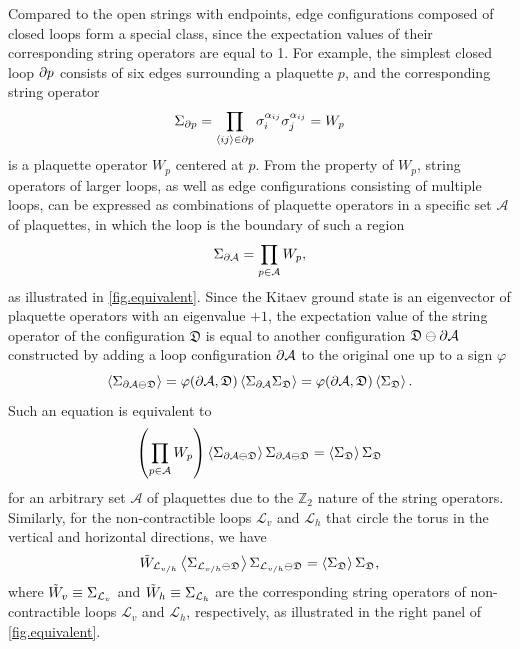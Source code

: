 Compared to the open strings with endpoints, edge configurations composed of closed loops form a special class, since the expectation values of their corresponding string operators are equal to 1. For example, the simplest closed loop $\partial p$ consists of six edges surrounding a plaquette $p$, and the corresponding string operator 
\[
\Sigma_{\partial p} = \prod_{\left\langle ij \right\rangle\in\partial p}\sigma^{\alpha_{ij}}_i\sigma^{\alpha_{ij}}_j = W_p
\]
is a plaquette operator $W_p$ centered at $p$. From the property of $W_p$, string operators of larger loops, as well as edge configurations consisting of multiple loops, can be expressed as combinations of plaquette operators in a specific set $\mathcal{A}$ of plaquettes, in which the loop is the boundary of such a region
\begin{equation}\label{equ.lattice-Stokes}
    \Sigma_{\partial\mathcal{A}} = \prod_{p\in\mathcal{A}}W_p,
\end{equation}
as illustrated in \autoref{fig.equivalent}. 
%
Since the Kitaev ground state is an eigenvector of plaquette operators with an eigenvalue $+1$, the expectation value of the string operator of the configuration $\mathfrak{D}$ is equal to another configuration $\mathfrak{D}\ominus\partial\mathcal{A}$ constructed by adding a loop configuration $\partial\mathcal{A}$ to the original one up to a sign $\varphi$
\[
\left\langle \Sigma_{\partial\mathcal{A}\ominus\mathfrak{D}} \right\rangle
= 
\varphi(\partial\mathcal{A},\mathfrak{D}) \left\langle \Sigma_{\partial\mathcal{A}}\Sigma_{\mathfrak{D}} \right\rangle = 
\varphi(\partial\mathcal{A},\mathfrak{D}) \left\langle \Sigma_{\mathfrak{D}} \right\rangle.
\]
Such an equation is equivalent to 
\begin{equation}\label{equ.one-loop-equivalence}
\left( \prod_{p\in\mathcal{A}}W_p \right)
\left\langle \Sigma_{\partial\mathcal{A}\ominus\mathfrak{D}} \right\rangle\Sigma_{\partial\mathcal{A}\ominus\mathfrak{D}} = \left\langle \Sigma_{\mathfrak{D}} \right\rangle\Sigma_{\mathfrak{D}}
\end{equation}
for an arbitrary set $\mathcal{A}$ of plaquettes due to the $\mathbb{Z}_2$ nature of the string operators. Similarly, for the non-contractible loops $\mathcal{L}_v$ and $\mathcal{L}_h$ that circle the torus in the vertical and horizontal directions, we have
\begin{equation}\label{equ.global-loop-equivalence}
\Tilde{W}_{\mathcal{L}_{v/h}}\left\langle \Sigma_{\mathcal{L}_{v/h}\ominus\mathfrak{D}} \right\rangle\Sigma_{\mathcal{L}_{v/h}\ominus\mathfrak{D}} = \left\langle \Sigma_{\mathfrak{D}} \right\rangle\Sigma_{\mathfrak{D}}, 
\end{equation}
where $\Tilde{W}_v\equiv\Sigma_{\mathcal{L}_v}$ and $\Tilde{W}_h\equiv\Sigma_{\mathcal{L}_h}$ are the corresponding string operators of non-contractible loops $\mathcal{L}_v$ and $\mathcal{L}_h$, respectively, as illustrated in the right panel of \autoref{fig.equivalent}.
